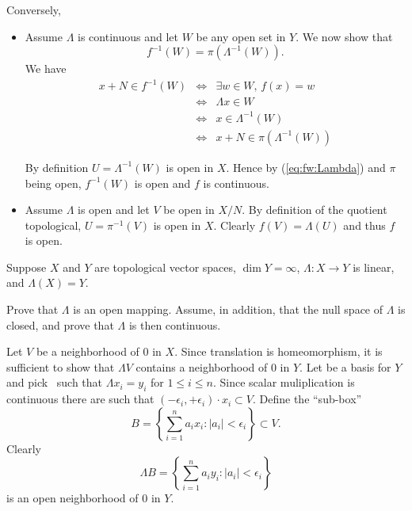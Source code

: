 \begin{enumerate}
Conversely,

\begin{itemize}

\item
Assume \(\Lambda\) is continuous and let $W$ be any open set in $Y$.
We now show that 
\begin{equation} \label{eq:fw:Lambda}
f^{-1}(W) = \pi(\Lambda^{-1}(W)).
\end{equation}
We have 
\begin{eqnarray*}
x+N \in f^{-1}(W) 
  & \Leftrightarrow & \exists w\in W,\, f(x)=w \\
  & \Leftrightarrow & \Lambda x \in W \\
  & \Leftrightarrow & x \in \Lambda^{-1}(W) \\
  & \Leftrightarrow & x+N \in  \pi(\Lambda^{-1}(W))
\end{eqnarray*}

By definition \(U = \Lambda^{-1}(W)\) is open in $X$.
Hence by (\ref{eq:fw:Lambda}) and \(\pi\) being open,
\(f^{-1}(W)\) is open and $f$ is continuous.

\item 
Assume \(\Lambda\) is open and let $V$ be open in \(X/N\).
By definition of the quotient topological, \(U = \pi^{-1}(V)\) 
is open in $X$. Clearly \(f(V) = \Lambda(U)\) and thus $f$ is open.
\end{itemize}


\begin{excopy}
Suppose $X$ and $Y$ are topological vector spaces, \(\dim Y = \infty\),
\(\Lambda: X\rightarrow Y\) is linear, and \(\Lambda(X)=Y\).
\begin{itemize}
  Prove that \(\Lambda\) is an open mapping.
   Assume, in addition, that the null space of \(\Lambda\) is closed,
   and prove that \(\Lambda\) is then continuous.
\end{itemize}
\end{excopy}

\begin{itemize}
  Let $V$ be a neighborhood of $0$ in $X$.
  Since translation is homeomorphism, it is sufficient to show
  that \(\Lambda V\) contains a neighborhood of $0$ in $Y$.
  Let  be a basis for $Y$
  and pick \seqxn\ such that \(\Lambda x_i = y_i\) for \(1\leq i \leq n\).
  Since scalar muliplication is continuous there are \seqn{\epsilon}
  such that \((-\epsilon_i,+\epsilon_i)\cdot x_i \subset V\).
  Define the ``sub-box''
  \begin{equation*}
   B = \left\{\sum_{i=1}^n a_i x_i: |a_i| < \epsilon_i\right\} \subset V.
  \end{equation*}
  Clearly 
  \begin{equation*}
   \Lambda B = \left\{\sum_{i=1}^n a_i y_i: |a_i| < \epsilon_i\right\}
  \end{equation*}
  is an open neighborhood of $0$ in $Y$.
  

\end{itemize}
\end{enumerate}
